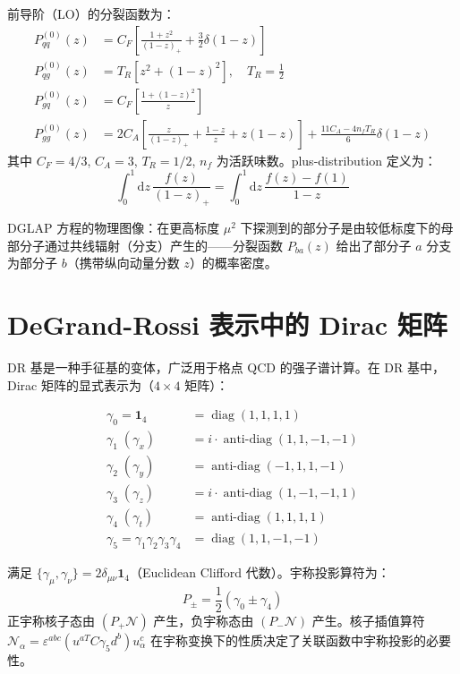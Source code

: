 \documentclass[11pt,a4paper]{ctexart}
\newcommand{\diag}{\operatorname{diag}}
\begin{document}
前导阶（LO）的分裂函数为：
\begin{align}
P_{qq}^{(0)}(z) &= C_F \left[ \frac{1+z^2}{(1-z)_+} + \frac{3}{2} \delta(1-z) \right] \\
P_{qg}^{(0)}(z) &= T_R \left[ z^2 + (1-z)^2 \right], \quad T_R = \frac{1}{2} \\
P_{gq}^{(0)}(z) &= C_F \left[ \frac{1+(1-z)^2}{z} \right] \\
P_{gg}^{(0)}(z) &= 2 C_A \left[ \frac{z}{(1-z)_+} + \frac{1-z}{z} + z(1-z) \right]
+ \frac{11 C_A - 4 n_f T_R}{6} \delta(1-z)
\end{align}
其中 $C_F = 4/3$, $C_A = 3$, $T_R = 1/2$, $n_f$ 为活跃味数。plus-distribution 定义为：
\begin{equation}
\int_0^1 \mathrm{d}z \, \frac{f(z)}{(1-z)_+} = \int_0^1 \mathrm{d}z \, \frac{f(z) - f(1)}{1-z}
\end{equation}

DGLAP 方程的物理图像：在更高标度 $\mu^2$ 下探测到的部分子是由较低标度下的母部分子通过共线辐射（分支）产生的——分裂函数 $P_{ba}(z)$ 给出了部分子 $a$ 分支为部分子 $b$（携带纵向动量分数 $z$）的概率密度。

\section{DeGrand-Rossi 表示中的 Dirac 矩阵}

DR 基是一种手征基的变体，广泛用于格点 QCD 的强子谱计算。在 DR 基中，Dirac 矩阵的显式表示为（$4\times 4$ 矩阵）：

\begin{align}
\gamma_0 = \mathbf{1}_4 &= \diag(1, 1, 1, 1) \\
\gamma_1 \;(\gamma_x) &= i \cdot \operatorname{anti-diag}(1, 1, -1, -1) \\
\gamma_2 \;(\gamma_y) &= \operatorname{anti-diag}(-1, 1, 1, -1) \\
\gamma_3 \;(\gamma_z) &= i \cdot \operatorname{anti-diag}(1, -1, -1, 1) \\
\gamma_4 \;(\gamma_t) &= \operatorname{anti-diag}(1, 1, 1, 1) \\
\gamma_5 = \gamma_1\gamma_2\gamma_3\gamma_4 &= \diag(1, 1, -1, -1)
\end{align}

满足 $\{\gamma_\mu, \gamma_\nu\} = 2\delta_{\mu\nu} \mathbf{1}_4$（Euclidean Clifford 代数）。宇称投影算符为：
\begin{equation}
P_{\pm} = \frac{1}{2} (\gamma_0 \pm \gamma_4)
\end{equation}
正宇称核子态由 $(P_+ \mathcal{N})$ 产生，负宇称态由 $(P_- \mathcal{N})$ 产生。核子插值算符 $\mathcal{N}_\alpha = \varepsilon^{abc} (u^{aT} C\gamma_5 d^{b}) u^{c}_\alpha$ 在宇称变换下的性质决定了关联函数中宇称投影的必要性。
\end{document}
